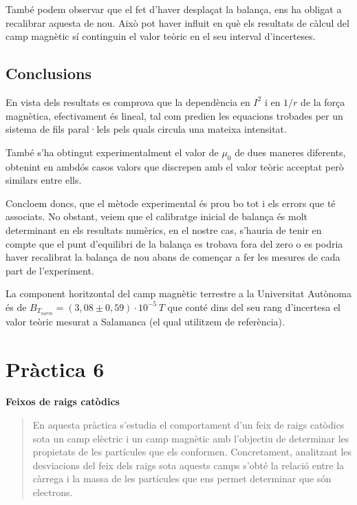 \documentclass[11pt]{article}
\numberwithin{equation}{section}
\numberwithin{figure}{section}
\numberwithin{table}{section}
\begin{document}
També podem observar que el fet d'haver desplaçat la balança, ens ha obligat a recalibrar aquesta de nou. Això pot haver influit en què els resultats de càlcul del camp magnètic sí continguin el valor teòric en el seu interval d'incerteses.

\subsection{Conclusions}\label{sec: PR2_concl}

En vista dels resultats es comprova que la dependència en $I^2$ i en $1/r$ de la força magnètica, efectivament és lineal, tal com predien les equacions trobades per un sistema de fils paral·lels pels quals circula una mateixa intensitat. 

També s’ha obtingut experimentalment el valor de $\mu_0$ de dues maneres diferents, obtenint en ambdós casos valors que discrepen amb el valor teòric acceptat però similars entre ells.

Concloem doncs, que el mètode experimental és prou bo tot i els errors que té associats. No obstant, veiem que el calibratge inicial de balança és molt determinant en els resultats numèrics, en el nostre cas, s'hauria de tenir en compte que el punt d'equilibri de la balança es trobava fora del zero o es podria haver recalibrat la balança de nou abans de començar a fer les mesures de cada part de l'experiment.

La component horitzontal del camp magnètic terrestre a la Universitat Autònoma és de $B_{T_{norm}}= (3,08 \pm 0,59)\cdot10^{-5} \, T$ que conté dins del seu rang d’incertesa el valor teòric mesurat a Salamanca (el qual utilitzem de referència).

\newpage

\section{\huge \textbf{Pràctica 6}}  %

\vspace{.5em}  %

{\Huge \textbf{Feixos de raigs catòdics}}  %

\begin{abstract}
     En aquesta pràctica s'estudia el comportament d'un feix de raigs catòdics sota un camp elèctric i un camp magnètic amb l'objectiu de determinar les propietats de les partícules que els conformen. Concretament, analitzant les desviacions del feix dels raigs sota aquests camps s'obté la relació entre la càrrega i la massa de les partícules que ens permet determinar que són electrons.
\end{abstract}
\end{document}
